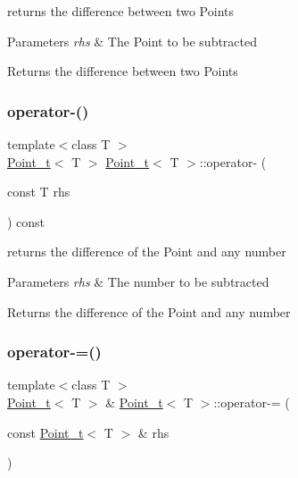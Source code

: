 returns the difference between two Points 


\begin{DoxyParams}{Parameters}
{\em rhs} & The Point to be subtracted\\
\hline
\end{DoxyParams}
\begin{DoxyReturn}{Returns}
the difference between two Points 
\end{DoxyReturn}
\mbox{\label{class_point__t_a6c180a0384480acf4929b75557d96748}} 
\subsubsection{\texorpdfstring{operator-\/()}{operator-()}\hspace{0.1cm}{\footnotesize\ttfamily [2/2]}}
{\footnotesize\ttfamily template$<$class T $>$ \\
\hyperlink{class_point__t}{Point\+\_\+t}$<$ T $>$ \hyperlink{class_point__t}{Point\+\_\+t}$<$ T $>$\+::operator-\/ (\begin{DoxyParamCaption}\item[{const T}]{rhs }\end{DoxyParamCaption}) const}



returns the difference of the Point and any number 


\begin{DoxyParams}{Parameters}
{\em rhs} & The number to be subtracted\\
\hline
\end{DoxyParams}
\begin{DoxyReturn}{Returns}
the difference of the Point and any number 
\end{DoxyReturn}
\mbox{\label{class_point__t_a510c1649a1ff3b46bb602a48de37d7c0}} 
\subsubsection{\texorpdfstring{operator-\/=()}{operator-=()}\hspace{0.1cm}{\footnotesize\ttfamily [1/2]}}
{\footnotesize\ttfamily template$<$class T $>$ \\
\hyperlink{class_point__t}{Point\+\_\+t}$<$ T $>$ \& \hyperlink{class_point__t}{Point\+\_\+t}$<$ T $>$\+::operator-\/= (\begin{DoxyParamCaption}\item[{const \hyperlink{class_point__t}{Point\+\_\+t}$<$ T $>$ \&}]{rhs }\end{DoxyParamCaption})}



